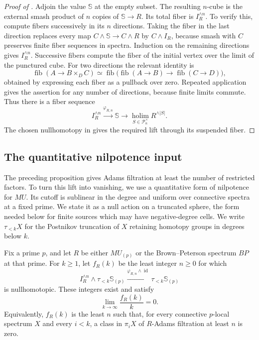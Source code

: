 \begin{proof}[Proof of ]
Adjoin the value $\mathbb S$ at the empty subset.  The resulting
$n$-cube is the external smash product of $n$ copies of
$\mathbb S\to R$.  Its total fiber is $I_R^{\wedge n}$.
To verify this, compute fibers successively in its $n$ directions.
Taking the fiber in the last direction replaces every map
$C\wedge\mathbb S\to C\wedge R$ by $C\wedge I_R$, because
smash with $C$ preserves finite fiber sequences in spectra.
Induction on the remaining directions gives $I_R^{\wedge n}$.
Successive fibers compute the fiber of the initial vertex over the
limit of the punctured cube.  For two directions the relevant identity is
\[
\operatorname{fib}(A\longrightarrow B\times_D C)
\simeq
\operatorname{fib}\bigl(
 \operatorname{fib}(A\to B)\longrightarrow
 \operatorname{fib}(C\to D)\bigr),
\]
obtained by expressing each fiber as a pullback over zero.  Repeated
application gives the assertion for any number of directions, because
finite limits commute.  Thus there is a fiber sequence
\[
I_R^{\wedge n}\xrightarrow{\varphi_{R,n}}\mathbb S
 \longrightarrow
\operatorname*{holim}_{S\in\mathcal P_n^\times}R^{\wedge|S|}.
\]
The chosen nullhomotopy in  gives the
required lift through its suspended fiber.
\end{proof}

\subsection{The quantitative nilpotence input}

The preceding proposition gives Adams filtration at least the number
of restricted factors.  To turn this lift into vanishing,
we use a quantitative form of nilpotence for $MU$.  Its cutoff is
sublinear in the degree and uniform over connective spectra at a fixed
prime.  We state it as a null action on a truncated sphere, the form
needed below for finite sources which may have negative-degree cells.
We write $\tau_{<k}X$ for the Postnikov truncation of $X$ retaining
homotopy groups in degrees below $k$.

\begin{theorem}
\label{thm:quantitative-nilpotence}
Fix a prime $p$, and let $R$ be either $MU_{(p)}$ or the
Brown--Peterson spectrum $BP$ at that prime.
For $k\geq1$, let $f_R(k)$ be the least integer $n\geq0$ for which
\begin{equation}
\label{eq:nilpotence-truncated-action}
I_R^{\wedge n}\wedge\tau_{<k}\mathbb S_{(p)}
 \xrightarrow{\varphi_{R,n}\wedge\operatorname{id}}
\tau_{<k}\mathbb S_{(p)}
\end{equation}
is nullhomotopic.  These integers exist and satisfy
\[
\lim_{k\to\infty}\frac{f_R(k)}{k}=0.
\]
Equivalently, $f_R(k)$ is the least $n$ such that, for every connective
$p$-local spectrum $X$ and every $i<k$, a class in $\pi_iX$ of
$R$-Adams filtration at least $n$ is zero.
\end{theorem}

